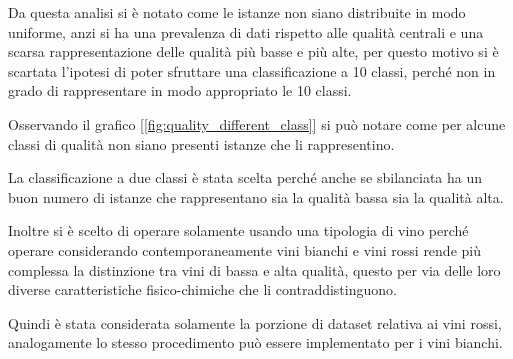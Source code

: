 \noindent
Da questa analisi si è notato come le istanze non siano distribuite in modo uniforme, anzi si ha una prevalenza di dati rispetto alle qualità centrali e una scarsa rappresentazione delle qualità più basse e più alte, per questo motivo si è scartata l'ipotesi di poter sfruttare una classificazione a 10 classi, perché non in grado di rappresentare in modo appropriato le 10 classi.

\noindent
Osservando il grafico [\ref{fig:quality_different_class}] si può notare come per alcune classi di qualità non siano presenti istanze che li rappresentino.

\noindent
La classificazione a due classi è stata scelta perché anche se sbilanciata ha un buon numero di istanze che rappresentano sia la qualità bassa sia la qualità alta.

\noindent
Inoltre si è scelto di operare solamente usando una tipologia di vino perché operare considerando contemporaneamente vini bianchi e vini rossi rende più complessa la distinzione tra vini di bassa e alta qualità, questo per via delle loro diverse caratteristiche fisico-chimiche che li contraddistinguono.

\noindent
Quindi è stata considerata solamente la porzione di dataset relativa ai vini rossi, analogamente lo stesso procedimento può essere implementato per i vini bianchi. 